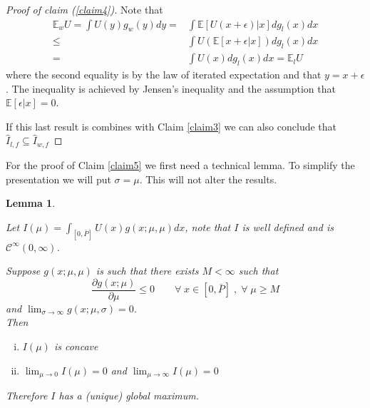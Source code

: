 \documentclass[10pt]{article}
\newtheorem{lem}[theorem]{Lemma}
\begin{document}
\pagebreak

\begin{proof}[Proof of claim (\ref{claim4})]
Note that
\begin{align*}
\mathbb{E}_w U=\int U(y)g_w(y)dy=&\int \mathbb{E}[U(x+\epsilon)|x]dg_l(x)dx\\
\leq&\int U(\mathbb{E}[x+\epsilon|x])dg_l(x)dx\\
=&\int U(x)dg_l(x)dx=\mathbb{E}_l U
\end{align*}
where the second equality is by the law of iterated expectation and that $y=x+\epsilon$. The inequality is achieved by Jensen's inequality and the assumption that $\mathbb{E}[\epsilon|x]=0$.

If this last result is combines with Claim \ref{claim3} we can also conclude that $\hat{I}_{l,f}\subseteq \hat{I}_{w,f}$

\end{proof}


For the proof of Claim \ref{claim5} we first need a technical lemma. To simplify the presentation we will put $\sigma=\mu$. This will not alter the results.

\begin{lem}
\label{existence_uniqueness}

Let $I(\mu)=\int_{[0,\bar{P}]}U(x)g(x;\mu,\mu)dx$, note that $I$ is well defined and is $\mathcal{C}^{\infty}(0,\infty)$.

Suppose $g(x;\mu,\mu)$ is such that there exists $M<\infty$ such that 
\[\frac{\partial g(x;\mu)}{\partial \mu}\leq 0\quad \quad \forall\;x\in[0,\bar{P}]\;,\;\forall\;\mu\geq M\]
and $\lim_{\sigma\rightarrow \infty} g(x;\mu,\sigma)=0$.\\

Then 
\begin{enumerate}[(i)]
    \item $I(\mu)$ is concave
    \item $\lim_{\mu\rightarrow 0} I(\mu)=0$ and $\lim_{\mu\rightarrow\infty} I(\mu)=0$
\end{enumerate}
Therefore $I$ has a (unique) global maximum.
\end{lem}
\end{document}
